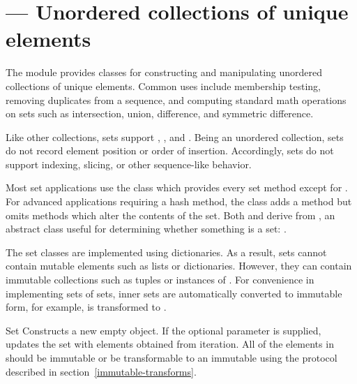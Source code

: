 \section{ ---
         Unordered collections of unique elements}



The  module provides classes for constructing and manipulating
unordered collections of unique elements.  Common uses include membership
testing, removing duplicates from a sequence, and computing standard math
operations on sets such as intersection, union, difference, and symmetric
difference.

Like other collections, sets support ,
, and .  Being an
unordered collection, sets do not record element position or order of
insertion.  Accordingly, sets do not support indexing, slicing, or
other sequence-like behavior.

Most set applications use the  class which provides every set
method except for . For advanced applications requiring
a hash method, the  class adds a 
method but omits methods which alter the contents of the set. Both
 and  derive from , an
abstract class useful for determining whether something is a set:
.

The set classes are implemented using dictionaries.  As a result, sets
cannot contain mutable elements such as lists or dictionaries.
However, they can contain immutable collections such as tuples or
instances of .  For convenience in implementing
sets of sets, inner sets are automatically converted to immutable
form, for example,  is transformed to
.

\begin{classdesc}{Set}{}
Constructs a new empty  object.  If the optional 
parameter is supplied, updates the set with elements obtained from iteration.
All of the elements in  should be immutable or be transformable
to an immutable using the protocol described in
section~\ref{immutable-transforms}.
\end{classdesc}

